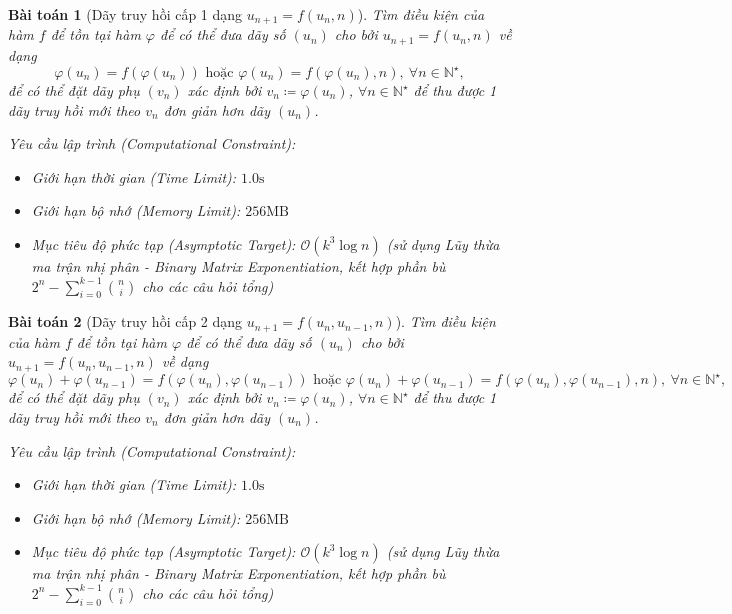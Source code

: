 \documentclass{article}
\newtheorem{baitoan}{Bài toán}
\begin{document}
\begin{baitoan}[Dãy truy hồi cấp 1 dạng $u_{n+1} = f(u_n,n)$]
	Tìm điều kiện của hàm $f$ để tồn tại hàm $\varphi$ để có thể đưa dãy số $(u_n)$ cho bởi $u_{n+1} = f(u_n,n)$ về dạng
	\begin{equation*}
		\varphi(u_n) = f(\varphi(u_n))\mbox{ hoặc }\varphi(u_n) = f(\varphi(u_n),n),\ \forall n\in\mathbb{N}^\star,
	\end{equation*}
	để có thể đặt dãy phụ $(v_n)$ xác định bởi $v_n\coloneqq\varphi(u_n)$, $\forall n\in\mathbb{N}^\star$ để thu được 1 dãy truy hồi mới theo $v_n$ đơn giản hơn dãy $(u_n)$.

    \vspace{0.5em}
    \emph{Yêu cầu lập trình (Computational Constraint):}
    \begin{itemize}
        \item Giới hạn thời gian (Time Limit): $1.0\mathrm{s}$
        \item Giới hạn bộ nhớ (Memory Limit): $256\mathrm{MB}$
        \item Mục tiêu độ phức tạp (Asymptotic Target): $\mathcal{O}(k^3 \log n)$ (sử dụng Lũy thừa ma trận nhị phân - Binary Matrix Exponentiation, kết hợp phần bù $2^n - \sum_{i=0}^{k-1} \binom{n}{i}$ cho các câu hỏi tổng)
    \end{itemize}
\end{baitoan}


\begin{baitoan}[Dãy truy hồi cấp 2 dạng $u_{n+1} = f(u_n,u_{n-1},n)$]
	Tìm điều kiện của hàm $f$ để tồn tại hàm $\varphi$ để có thể đưa dãy số $(u_n)$ cho bởi $u_{n+1} = f(u_n,u_{n-1},n)$ về dạng
	\begin{equation*}
		\varphi(u_n) + \varphi(u_{n-1}) = f(\varphi(u_n),\varphi(u_{n-1}))\mbox{ hoặc }\varphi(u_n) + \varphi(u_{n-1}) = f(\varphi(u_n),\varphi(u_{n-1}),n),\ \forall n\in\mathbb{N}^\star,
	\end{equation*}
	để có thể đặt dãy phụ $(v_n)$ xác định bởi $v_n\coloneqq\varphi(u_n)$, $\forall n\in\mathbb{N}^\star$ để thu được 1 dãy truy hồi mới theo $v_n$ đơn giản hơn dãy $(u_n)$.

    \vspace{0.5em}
    \emph{Yêu cầu lập trình (Computational Constraint):}
    \begin{itemize}
        \item Giới hạn thời gian (Time Limit): $1.0\mathrm{s}$
        \item Giới hạn bộ nhớ (Memory Limit): $256\mathrm{MB}$
        \item Mục tiêu độ phức tạp (Asymptotic Target): $\mathcal{O}(k^3 \log n)$ (sử dụng Lũy thừa ma trận nhị phân - Binary Matrix Exponentiation, kết hợp phần bù $2^n - \sum_{i=0}^{k-1} \binom{n}{i}$ cho các câu hỏi tổng)
    \end{itemize}
\end{baitoan}
\end{document}
